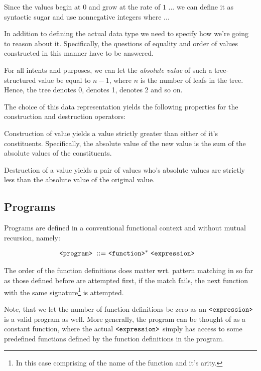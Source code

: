 Since the values begin at $0$ and grow at the rate of $1$ ... we can define it
as syntactic sugar and use nonnegative integers where ...

In addition to defining the actual data type we need to specify how we're going
to reason about it. Specifically, the questions of equality and order of values
constructed in this manner have to be answered.

For all intents and purposes, we can let the \emph{absolute value} of such a
tree-structured value be equal to $n-1$, where $n$ is the number of leafs in
the tree. Hence, the tree  denotes $0$,  denotes 1,
 denotes 2 and so on.

The choice of this data representation yields the following properties for the
construction and destruction operators:

\begin{lemma} Construction of value yields a value strictly greater than either
of it's constituents. Specifically, the absolute value of the new value is the
sum of the absolute values of the constituents.\end{lemma}

\begin{lemma} Destruction of a value yields a pair of values who's absolute
values are strictly less than the absolute value of the original
value.\end{lemma}

\subsection{Programs}

Programs are defined in a conventional functional context and without mutual
recursion, namely:

\begin{align}
\text{{\ttfamily<program>}}\ ::=&\ \text{{\ttfamily<function>}}^*\ \text{{\ttfamily<expression>}}
\end{align}

The order of the function definitions does matter wrt. pattern matching in so
far as those defined before are attempted first, if the match fails, the next
function with the same signature\footnote{In this case comprising of the name
of the function and it's arity.} is attempted.

Note, that we let the number of function definitions be zero as an
$\text{{\ttfamily<expression>}}$ is a valid program as well. More generally, the program
can be thought of as a constant function, where the actual
$\text{{\ttfamily<expression>}}$ simply has access to some predefined functions defined
by the function definitions in the program.

